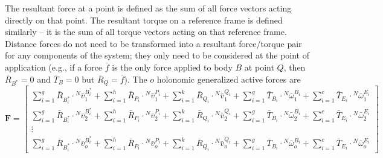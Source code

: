 \documentclass[smallcondensed,final]{svjour3}                     %
\begin{document}
The resultant force at a point is defined as the sum of all force vectors
acting directly on that point. The resultant torque on a reference frame is
defined similarly -- it is the sum of all torque vectors acting on that
reference frame. Distance forces do not need to be transformed into a resultant
force/torque pair for any components of the system; they only need to be
considered at the point of application (e.g., if a force $\bar{f}$ is the only
force applied to body $B$ at point $Q$, then $\bar{R}_{B^*}=0$ and
$\bar{T}_B=0$ but $\bar{R}_Q=\bar{f}$). The $o$ holonomic generalized active forces are
\begin{equation}
\label{eq:definition_F}
\mathbf{F} =
\begin{bmatrix}
\displaystyle \sum_{i=1}^g \bar{R}_{B^*_i} \cdot {^N}\bar{v}^{B^*_i}_1 +
\sum_{i=1}^h \bar{R}_{P_i} \cdot {^N}\bar{v}^{P_i}_1 +
\sum_{i=1}^k \bar{R}_{Q_i} \cdot {^N}\bar{v}^{Q_i}_1 +
\sum_{i=1}^g \bar{T}_{B_i} \cdot {^N}\bar{\omega}^{B_i}_1 +
\sum_{i=1}^c \bar{T}_{E_i} \cdot {^N}\bar{\omega}^{E_i}_1 \\
\displaystyle \sum_{i=1}^g \bar{R}_{B^*_i} \cdot {^N}\bar{v}^{B^*_i}_2 +
\sum_{i=1}^h \bar{R}_{P_i} \cdot {^N}\bar{v}^{P_i}_2 +
\sum_{i=1}^k \bar{R}_{Q_i} \cdot {^N}\bar{v}^{Q_i}_2 +
\sum_{i=1}^g \bar{T}_{B_i} \cdot {^N}\bar{\omega}^{B_i}_2 +
\sum_{i=1}^c \bar{T}_{E_i} \cdot {^N}\bar{\omega}^{E_i}_2 \\
\displaystyle \vdots \\
\displaystyle \sum_{i=1}^g \bar{R}_{B^*_i} \cdot {^N}\bar{v}^{B^*_i}_o +
\sum_{i=1}^h \bar{R}_{P_i} \cdot {^N}\bar{v}^{P_i}_o +
\sum_{i=1}^k \bar{R}_{Q_i} \cdot {^N}\bar{v}^{Q_i}_o +
\sum_{i=1}^g \bar{T}_{B_i} \cdot {^N}\bar{\omega}^{B_i}_o +
\sum_{i=1}^c \bar{T}_{E_i} \cdot {^N}\bar{\omega}^{E_i}_o
\end{bmatrix}
\end{equation}
\end{document}
